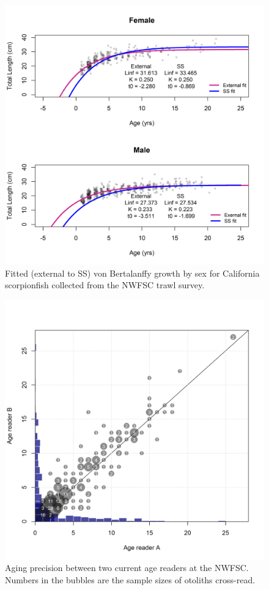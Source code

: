 \documentclass[12pt,]{article}
\begin{document}
\begin{figure}[htbp]
\centering
\includegraphics{Figures/vonB_compare.png}
\caption{Fitted (external to SS) von Bertalanffy growth by sex for
California scorpionfish collected from the NWFSC trawl survey.
\label{fig:vonB_compare}}
\end{figure}

\begin{figure}[htbp]
\centering
\includegraphics{Figures/Fleet8_NWFSCTrawl_ageerror.png}
\caption{Aging precision between two current age readers at the NWFSC.
Numbers in the bubbles are the sample sizes of otoliths cross-read.
\label{fig:Fleet8_NWFSCTrawl_ageerror}}
\end{figure}
\end{document}
